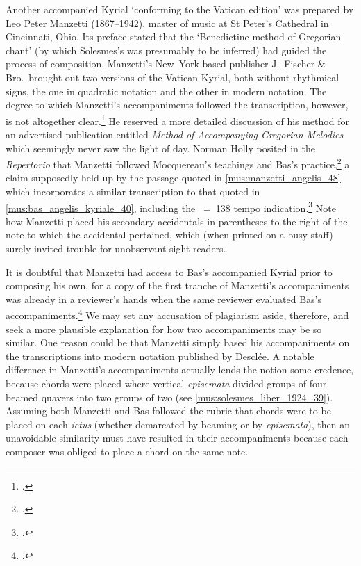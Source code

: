 Another accompanied Kyrial `conforming to the Vatican edition' was prepared by Leo Peter Manzetti (1867--1942), master of music at St Peter's Cathedral in Cincinnati, Ohio.
Its preface stated that the `Benedictine method of Gregorian chant' (by which Solesmes's was presumably to be inferred) had guided the process of composition.
Manzetti's New~York-based publisher J.\ Fischer \& Bro.\ brought out two versions of the Vatican Kyrial, both without rhythmical signs, the one in quadratic notation and the other in modern notation.
The degree to which Manzetti's accompaniments followed the transcription, however, is not altogether clear.\footcite[p.~29* and \emph{passim}]{KyrialesiveOrdinarium1906}
He reserved a more detailed discussion of his method for an advertised publication entitled \emph{Method of Accompanying Gregorian Melodies} which seemingly never saw the light of day.
%
Norman Holly posited in the \emph{Repertorio} that Manzetti followed Mocquereau's teachings and Bas's practice,\footcite[49]{HollyLetterEditor1906} a claim supposedly held up by the passage quoted in \cref{mus:manzetti_angelis_48} which incorporates a similar transcription to that quoted in \cref{mus:bas_angelis_kyriale_40}, including the \quaver~=~138 tempo indication.\footcite[unpaginated preface and p.~48]{ManzettiOrganAccompanimentKyriale1906}
Note how Manzetti placed his secondary accidentals in parentheses to the right of the note to which the accidental pertained, which (when printed on a busy staff) surely invited trouble for unobservant sight-readers.

It is doubtful that Manzetti had access to Bas's accompanied Kyrial prior to composing his own, for a copy of the first tranche of Manzetti's accompaniments was already in a reviewer's hands when the same reviewer evaluated Bas's accompaniments.\footcite[179]{Bibliographiegregorienneeditions1906}
We may set any accusation of plagiarism aside, therefore, and seek a more plausible explanation for how two accompaniments may be so similar.
One reason could be that Manzetti simply based his accompaniments on the transcriptions into modern notation published by Desclée.
A notable difference in Manzetti's accompaniments actually lends the notion some credence, because chords were placed where vertical \emph{episemata} divided groups of four beamed quavers into two groups of two (see \cref{mus:solesmes_liber_1924_39}).
Assuming both Manzetti and Bas followed the rubric that chords were to be placed on each \emph{ictus} (whether demarcated by beaming or by \emph{episemata}), then an unavoidable similarity must have resulted in their accompaniments because each composer was obliged to place a chord on the same note.

